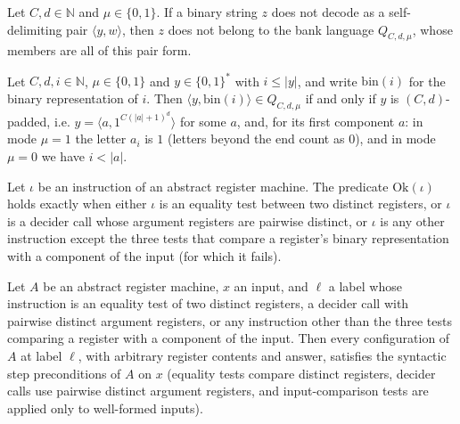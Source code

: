 \begin{lemma}
\label{Complexity.epad_not_mem_Q}
\leanok
{}
Let $C, d \in \mathbb{N}$ and $\mu \in \{0,1\}$. If a binary string $z$ does not decode as a
self-delimiting pair $\langle y, w\rangle$, then $z$ does not belong to the bank language
$Q_{C,d,\mu}$, whose members are all of this pair form.
\end{lemma}

\begin{lemma}
\label{Complexity.epad_query_mem_iff}
\leanok
{}
Let $C, d, i \in \mathbb{N}$, $\mu \in \{0,1\}$ and $y \in \{0,1\}^*$ with $i \le |y|$, and write
$\mathrm{bin}(i)$ for the binary representation of $i$. Then
$\langle y, \mathrm{bin}(i)\rangle \in Q_{C,d,\mu}$ if and only if $y$ is $(C,d)$-padded, i.e.
$y = \langle a, 1^{C(|a|+1)^d}\rangle$ for some $a$, and, for its first component $a$: in mode
$\mu = 1$ the letter $a_i$ is $1$ (letters beyond the end count as $0$), and in mode $\mu = 0$
we have $i < |a|$.
\end{lemma}

\begin{definition}
\label{Complexity.LogProg.epadOk}
\leanok
{}
Let $\iota$ be an instruction of an abstract register machine. The predicate
$\mathrm{Ok}(\iota)$ holds exactly when either $\iota$ is an equality test between two distinct
registers, or $\iota$ is a decider call whose argument registers are pairwise distinct, or
$\iota$ is any other instruction except the three tests that compare a register's binary
representation with a component of the input (for which it fails).
\end{definition}

\begin{lemma}
\label{Complexity.LogProg.epad_preS}
\leanok
{}
Let $A$ be an abstract register machine, $x$ an input, and $\ell$ a label whose instruction is an
equality test of two distinct registers, a decider call with pairwise distinct argument
registers, or any instruction other than the three tests comparing a register with a component
of the input. Then every configuration of $A$ at label $\ell$, with arbitrary register contents
and answer, satisfies the syntactic step preconditions of $A$ on $x$ (equality tests compare
distinct registers, decider calls use pairwise distinct argument registers, and input-comparison
tests are applied only to well-formed inputs).
\end{lemma}


